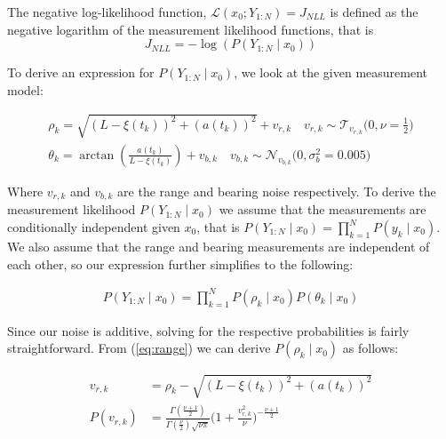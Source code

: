 \documentclass[11pt]{article}
\begin{document}
\begin{enumerate}[label=\alph*)]
    The negative log-likelihood function, $\mathcal{L}(x_0;Y_{1:N}) = J_{NLL}$ is defined as the negative logarithm of the measurement likelihood functions, that is
    \[
        J_{NLL} = -\log(P(Y_{1:N} \mid x_0))
    \]

    To derive an expression for $P(Y_{1:N} \mid x_0)$, we look at the given measurement model:

    \begin{align}
        \rho_k = \sqrt{(L-\xi(t_k))^2 + (a(t_k))^2} + v_{r,k} \quad v_{r,k} \sim \mathcal{T}_{v_{r,k}} \Big(0,\nu = \frac{1}{2}\Big) \label{eq:range}\\
        \theta_k = \arctan(\frac{a(t_k)}{L-\xi(t_k)}) + v_{b,k} \quad v_{b,k} \sim \mathcal{N}_{v_{b,k}} \Big(0,\sigma_b^2 = 0.005\Big)
        \label{eq:bearing}
    \end{align}
    
    Where $v_{r,k}$ and $v_{b,k}$ are the range and bearing noise respectively. To derive the measurement likelihood $P(Y_{1:N} \mid x_0)$ we assume that the measurements are conditionally independent 
    given $x_0$, that is $P(Y_{1:N} \mid x_0) = \prod_{k=1}^{N}P(y_k \mid x_0)$. We also assume that the range and bearing measurements are independent of each other, so our expression further simplifies to the following:

    \begin{align}
        P(Y_{1:N} \mid x_0) = \prod_{k=1}^{N}  P(\rho_k \mid x_0) P(\theta_k \mid x_0)
        \label{eq:likelihood}
    \end{align}


    Since our noise is additive, solving for the respective probabilities is fairly straightforward. From (\ref{eq:range}) we can derive $P(\rho_k \mid x_0)$ as follows:

    \begin{align*}
        v_{r,k} &= \rho_k - \sqrt{(L-\xi(t_k))^2 + (a(t_k))^2} \\
        P(v_{r,k}) &= \frac{\Gamma(\frac{\nu + 1}{2})}{\Gamma(\frac{\nu}{2})\sqrt{\nu\pi}}\Big(1+\frac{v_{r,k}^2}{\nu} \Big)^{-\frac{\nu+1}{2}}
    \end{align*}


\end{enumerate}
\end{document}
